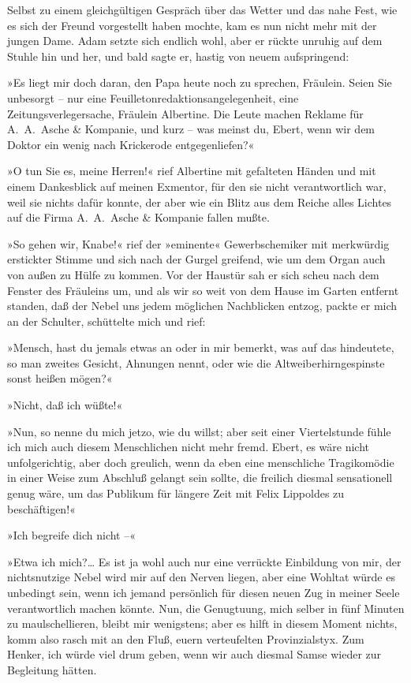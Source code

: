 Selbst zu einem gleichgültigen Gespräch über das Wetter und das
nahe Fest, wie es sich der Freund vorgestellt haben mochte, kam es
nun nicht mehr mit der jungen Dame. Adam setzte sich endlich wohl,
aber er rückte unruhig auf dem Stuhle hin und her, und bald sagte
er, hastig von neuem aufspringend:

»Es liegt mir doch daran, den Papa heute noch zu sprechen,
Fräulein. Seien Sie unbesorgt – nur eine
Feuilletonredaktionsangelegenheit, eine Zeitungsverlegersache,
Fräulein Albertine. Die Leute machen Reklame für A.~A.~Asche \&
Kompanie, und kurz – was meinst du, Ebert, wenn wir dem Doktor ein
wenig nach Krickerode entgegenliefen?«

»O tun Sie es, meine Herren!« rief Albertine mit gefalteten Händen
und mit einem Dankesblick auf meinen Exmentor, für den sie nicht
verantwortlich war, weil sie nichts dafür konnte, der aber wie ein
Blitz aus dem Reiche alles Lichtes auf die Firma A.~A.~Asche \&
Kompanie fallen mußte.

»So gehen wir, Knabe!« rief der »eminente« Gewerbschemiker mit
merkwürdig erstickter Stimme und sich nach der Gurgel greifend, wie
um dem Organ auch von außen zu Hülfe zu kommen. Vor der Haustür sah
er sich scheu nach dem Fenster des Fräuleins um, und als wir so
weit von dem Hause im Garten entfernt standen, daß der Nebel uns
jedem möglichen Nachblicken entzog, packte er mich an der Schulter,
schüttelte mich und rief:

»Mensch, hast du jemals etwas an oder in mir bemerkt, was auf das
hindeutete, so man zweites Gesicht, Ahnungen nennt, oder wie die
Altweiberhirngespinste sonst heißen mögen?«

»Nicht, daß ich wüßte!«

»Nun, so nenne du mich jetzo, wie du willst; aber seit einer
Viertelstunde fühle ich mich auch diesem Menschlichen nicht mehr
fremd. Ebert, es wäre nicht unfolgerichtig, aber doch greulich,
wenn da eben eine menschliche Tragikomödie in einer Weise zum
Abschluß gelangt sein sollte, die freilich diesmal sensationell
genug wäre, um das Publikum für längere Zeit mit Felix Lippoldes zu
beschäftigen!«

»Ich begreife dich nicht –«

»Etwa ich mich?\ldots{} Es ist ja wohl auch nur eine verrückte
Einbildung von mir, der nichtsnutzige Nebel wird mir auf den Nerven
liegen, aber eine Wohltat würde es unbedingt sein, wenn ich jemand
persönlich für diesen neuen Zug in meiner Seele verantwortlich
machen könnte. Nun, die Genugtuung, mich selber in fünf Minuten zu
maulschellieren, bleibt mir wenigstens; aber es hilft in diesem
Moment nichts, komm also rasch mit an den Fluß, euern verteufelten
Provinzialstyx. Zum Henker, ich würde viel drum geben, wenn wir
auch diesmal Samse wieder zur Begleitung hätten.

